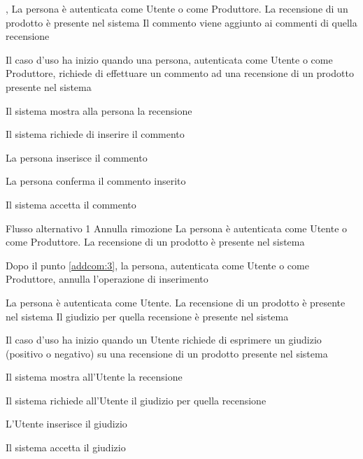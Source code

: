 \tabcuvspace

{, }
{La persona è autenticata come Utente o come Produttore. La recensione di un prodotto è presente nel sistema}
{Il commento viene aggiunto ai commenti di quella recensione}
{\begin{enumCU}
	\item Il caso d'uso ha inizio quando una persona, autenticata come Utente o come Produttore, richiede di effettuare un commento ad una recensione di un prodotto presente nel sistema
	\item Il sistema mostra alla persona la recensione
	\item Il sistema richiede di inserire il commento 
	\item La persona inserisce il commento \label{addcom:3}
	\item La persona conferma il commento inserito
	\item Il sistema accetta il commento
\end{enumCU}}
%
{Flusso alternativo 1}%
{Annulla rimozione}%
{La persona è autenticata come Utente o come Produttore. La recensione di un prodotto è presente nel sistema}
{\postNulle}%
{\begin{enumCU}
		\item Dopo il punto \ref{addcom:3}, la persona, autenticata come Utente o come Produttore, annulla l'operazione di inserimento
	\end{enumCU}}%

\tabcuvspace

{}{La persona è autenticata come Utente. La recensione di un prodotto è presente nel sistema}
{Il giudizio per quella recensione è presente nel sistema}
{\begin{enumCU}
	\item Il caso d'uso ha inizio quando un Utente richiede di esprimere un giudizio (positivo o negativo) su una recensione di un prodotto presente nel sistema
	\item Il sistema mostra all'Utente la recensione
	\item Il sistema richiede all'Utente il giudizio per quella recensione
	\item L'Utente inserisce il giudizio
	\item Il sistema accetta il giudizio
\end{enumCU}}



